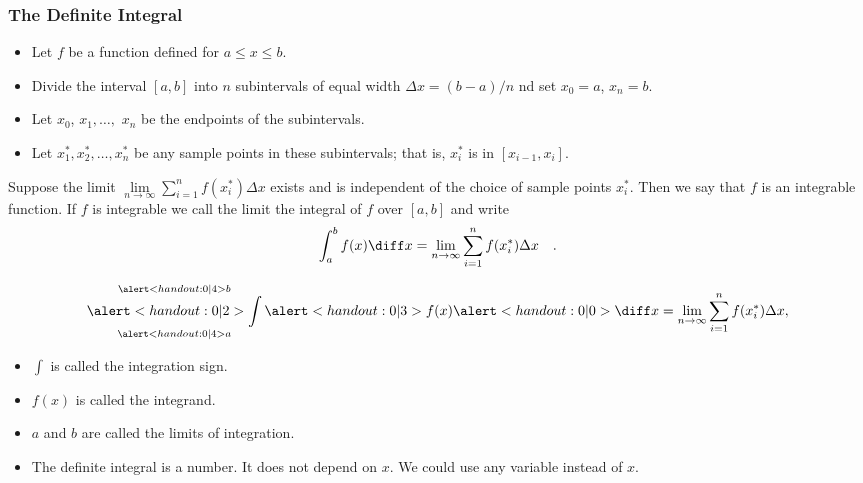 \begin{frame}\frametitle{ 
The Definite Integral}
\begin{definition}
\begin{itemize}
\item  Let $f$ be a function defined for $a\leq x\leq b$.
\item  Divide the interval $[a,b]$ into $n$ subintervals of equal width $\Delta x = (b-a)/n$ nd set $x_0=a$, $x_n=b$.
\item  Let $x_0$, $x_1,\ldots ,$ $x_n $ be the endpoints of the subintervals.
\item  Let $x_1^*, x_2^*, \ldots , x_n^*$ be any sample points in these subintervals; that is, $x_i^*$ is in $[x_{i-1},x_i]$.  
\end{itemize}
\abovedisplayskip=0pt
\belowdisplayskip=0pt
Suppose the limit $\lim\limits_{n\to \infty} \sum\limits_{i=1}^n f(x_i^*)\Delta x$ exists and is independent of the choice of sample points $x_i^*$. Then we say that $f$ is an integrable function. If $f$ is integrable we call the limit the integral of $f$ over $[a,b]$ and write
\[
\int_a^b f(x) \diff x = \lim_{n\to \infty} \sum_{i=1}^n f(x_i^*)\Delta x \quad .
\]
\end{definition}
\end{frame}

\begin{frame}
\[
\mathop{\alert<handout:0| 2>{\int}}_{\alert<handout:0| 4>{a}}^{\alert<handout:0| 4>{b}} \alert<handout:0| 3>{f(x)} \alert<handout:0| 0>{\diff x} = \lim_{n\to \infty} \sum_{i=1}^n f(x_i^*)\Delta x,
\]
\begin{itemize}
\item<1-| alert@2>  $\int$ is called the integration sign.
\item<1-| alert@3>  $f(x)$ is called the integrand.
\item<1-| alert@4>  $a$ and $b$ are called the limits of integration.
\item<5->  The definite integral is a number.  It does not depend on $x$.  We could use any variable instead of $x$.
\end{itemize}
%
\end{frame}
